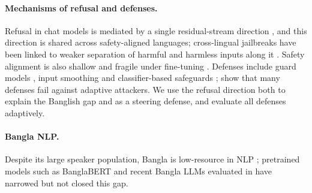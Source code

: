 \paragraph{Mechanisms of refusal and defenses.}
Refusal in chat models is mediated by a single residual-stream direction
\citep{arditi2024refusal}, and this direction is shared across
safety-aligned languages; cross-lingual jailbreaks have been linked to weaker
separation of harmful and harmless inputs along it
\citep{wang2025refusaluniversal}. Safety alignment is also shallow
\citep{qi2025safety} and fragile under fine-tuning \citep{qi2024finetuning}.
Defenses include guard models \citep{inan2023llamaguard, zeng2024shieldgemma},
input smoothing \citep{robey2023smoothllm} and classifier-based safeguards
\citep{sharma2025constitutional}; \citet{nasr2025attacker} show that many
defenses fail against adaptive attackers. We use the refusal direction both
to explain the Banglish gap and as a steering defense, and evaluate all
defenses adaptively.

\paragraph{Bangla NLP.}
Despite its large speaker population, Bangla is low-resource in NLP
\citep{joshi2020state}; pretrained models such as BanglaBERT
\citep{bhattacharjee2022banglabert} and recent Bangla LLMs evaluated in
\citet{banglaveilguard2026} have narrowed but not closed this gap.
